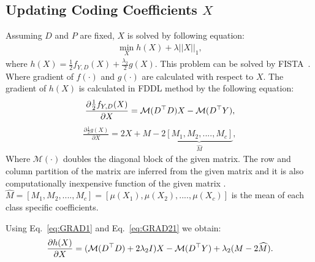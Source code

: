 \subsection*{Updating Coding Coefficients $X$}

Assuming $D$ and $P$ are fixed, $X$ is solved by following equation:
\begin{equation}
\begin{aligned}
\min_X h(X) + \lambda ||X||_1,
\end{aligned}
\label{eq:DLX}
\end{equation}
where $h(X) = \frac{1}{2}f_{Y,D}(X) + \frac{\lambda_2}{2}g(X)$. This problem can be solved by FISTA~\cite{beck2009fast}. Where gradient of $f(\cdot)$ and $g(\cdot)$ are calculated with respect to $X$.
The gradient of $h(X)$ is calculated in FDDL method by the following equation: 
\begin{equation}
\begin{aligned}
\frac{\partial \frac{1}{2}f_{Y,D}(X)}{\partial X} = \mathcal{M}(D^\top D)X - \mathcal{M}(D^\top Y),
\end{aligned}
\label{eq:GRAD1}
\end{equation}
\begin{equation}
\begin{aligned}
\frac{\partial \frac{1}{2}g(X)}{\partial X} = 2X + M -2\underbrace{[M_1, M_2 ,.... , M_c]}_{\widehat{M}},
\end{aligned}
\label{eq:GRAD21}
\end{equation}
Where $\mathcal{M(\cdot)}$ doubles the diagonal block of the given matrix. The row and column partition of the matrix are inferred from the given matrix and it is also computationally inexpensive function of the given matrix . $\widehat{M}=[M_1, M_2 ,.... , M_c] = [\mu(X_1), \mu(X_2) ,.... , \mu(X_c)]$ is the mean of each class specific coefficients.

\noindent
Using Eq.~\eqref{eq:GRAD1} and Eq.~\eqref{eq:GRAD21} we obtain:
\begin{equation}
\begin{aligned}
\frac{\partial h(X)}{\partial X} = (\mathcal{M} (D^\top D) + 2 \lambda_2 I)X - \mathcal{M}(D^\top Y)+\lambda_2(M-2 \widehat{M}).
\end{aligned}
\label{eq:GRAD2}
\end{equation}

